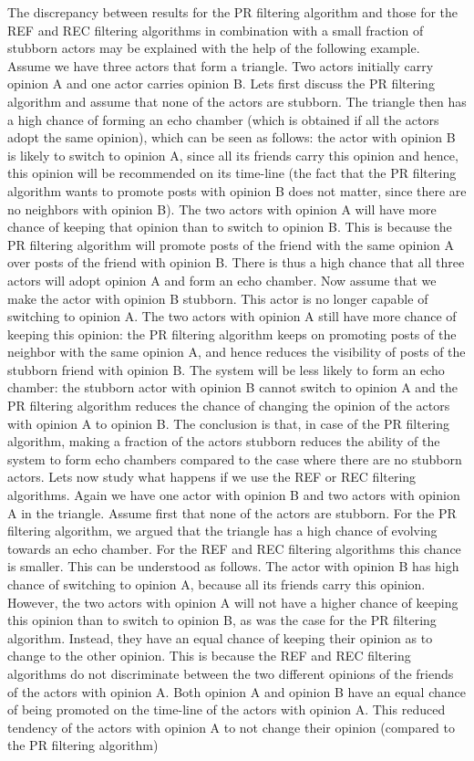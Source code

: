 \documentclass[11 pt , letterpaper , twoside , openright]{book}
\begin{document}
\newline
The discrepancy between results for the PR filtering algorithm and those for the REF and REC filtering algorithms in combination with a small fraction of stubborn actors may be explained with the help of the following example. Assume we have three actors that form a triangle. Two actors initially carry opinion A and one actor carries opinion B. Lets first discuss the PR filtering algorithm and assume that none of the actors are stubborn. The triangle then has a high chance of forming an echo chamber (which is obtained if all the actors adopt the same opinion), which can be seen as follows: the actor with opinion B is likely to switch to opinion A, since all its friends carry this opinion and hence, this opinion will be recommended on its time-line (the fact that the PR filtering algorithm wants to promote posts with opinion B does not matter, since there are no neighbors with opinion B). The two actors with opinion A will have more chance of keeping that opinion than to switch to opinion B. This is because the PR filtering algorithm will promote posts of the friend with the same opinion A over posts of the friend with opinion B. There is thus a high chance that all three actors will adopt opinion A and form an echo chamber. Now assume that we make the actor with opinion B stubborn. This actor is no longer capable of switching to opinion A. The two actors with opinion A still have more chance of keeping this opinion: the PR filtering algorithm keeps on promoting posts of the neighbor with the same opinion A, and hence reduces the visibility of posts of the stubborn friend with opinion B. The system will be less likely to form an echo chamber: the stubborn actor with opinion B cannot switch to opinion A and the PR filtering algorithm reduces the chance of changing the opinion of the actors with opinion A to opinion B. The conclusion is that, in case of the PR filtering algorithm, making a fraction of the actors stubborn reduces the ability of the system to form echo chambers compared to the case where there are no stubborn actors. Lets now study what happens if we use the REF or REC filtering algorithms. Again we have one actor with opinion B and two actors with opinion A in the triangle. Assume first that none of the actors are stubborn. For the PR filtering algorithm, we argued that the triangle has a high chance of evolving towards an echo chamber. For the REF and REC filtering algorithms this chance is smaller. This can be understood as follows. The actor with opinion B has high chance of switching to opinion A, because all its friends carry this opinion. However, the two actors with opinion A will not have a higher chance of keeping this opinion than to switch to opinion B, as was the case for the PR filtering algorithm. Instead, they have an equal chance of keeping their opinion as to change to the other opinion. This is because the REF and REC filtering algorithms do not discriminate between the two different opinions of the friends of the actors with opinion A. Both opinion A and opinion B have an equal chance of being promoted on the time-line of the actors with opinion A. This reduced tendency of the actors with opinion A to not change their opinion (compared to the PR filtering algorithm) 
\end{document}
